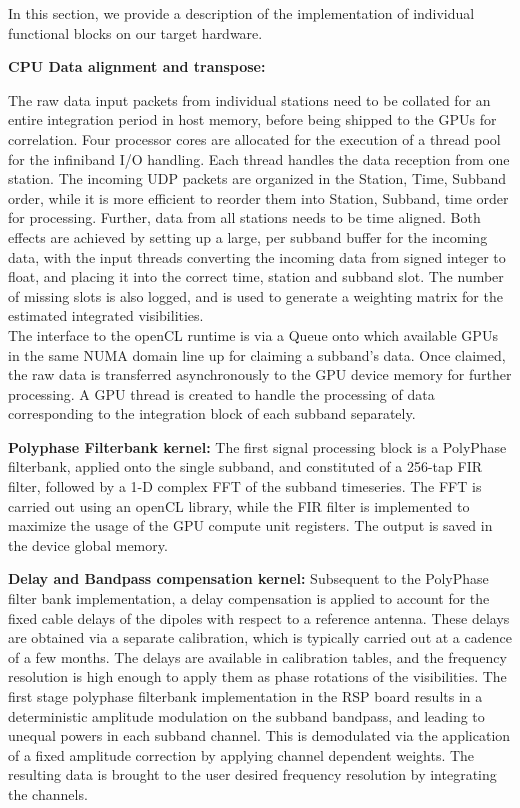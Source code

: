 \documentclass{ws-jai}
\begin{document}
In this  section, we provide a  description of the implementation  of individual
functional blocks on our target hardware.

\textbf {CPU  Data alignment  and transpose:}  

The raw data input  packets from individual stations need to  be collated for an
entire integration period  in host memory, before being shipped  to the GPUs for
correlation. Four  processor cores are allocated  for the execution of  a thread
pool for  the infiniband I/O  handling. Each  thread handles the  data reception
from one station. The incoming UDP  packets are organized in the {Station, Time,
  Subband} order,  while it  is more  efficient to  reorder them  into {Station,
  Subband, time} order for processing. Further,  data from all stations needs to
be time aligned.  Both  effects are achieved by setting up  a large, per subband
buffer for  the incoming data,  with the  input threads converting  the incoming
data from signed integer to float, and placing it into the correct time, station
and subband  slot. The number of  missing slots is  also logged, and is  used to
generate a weighting matrix for the estimated integrated visibilities.\\

The interface to the openCL runtime is  via a Queue onto which available GPUs in
the same NUMA domain  line up for claiming a subband's  data.  Once claimed, the
raw data  is transferred  asynchronously to  the GPU  device memory  for further
processing.  A  GPU  thread  is  created   to  handle  the  processing  of  data
corresponding to the integration block of each subband separately.

\textbf {Polyphase  Filterbank kernel:} The  first signal processing block  is a
PolyPhase  filterbank, applied  onto the  single subband,  and constituted  of a
256-tap FIR filter, followed by a 1-D complex FFT of the subband timeseries. The
FFT is carried out using an openCL  library, while the FIR filter is implemented
to maximize the usage of the GPU  compute unit registers. The output is saved in
the device global memory.

\textbf {Delay  and Bandpass compensation  kernel:} Subsequent to  the PolyPhase
filter bank implementation,  a delay compensation is applied to  account for the
fixed cable  delays of the dipoles  with respect to a  reference antenna.  These
delays are obtained  via a separate calibration, which is  typically carried out
at a cadence of  a few months.  The delays are  available in calibration tables,
and the frequency resolution is high enough  to apply them as phase rotations of
the visibilities. The first stage polyphase filterbank implementation in the RSP
board results in  a deterministic amplitude modulation on  the subband bandpass,
and leading to unequal powers in  each subband channel.  This is demodulated via
the application  of a fixed  amplitude correction by applying  channel dependent
weights. The resulting data is brought  to the user desired frequency resolution
by integrating the channels.
\end{document}
